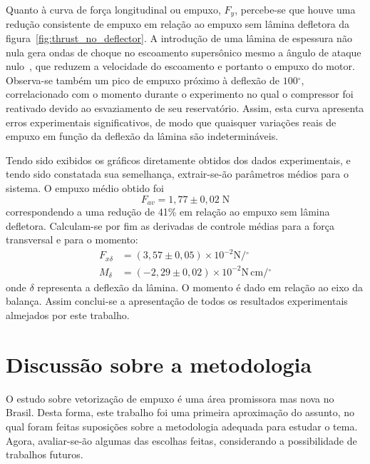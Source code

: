 Quanto à curva de força longitudinal ou empuxo, \(F_y\), percebe-se que houve uma redução consistente de empuxo em relação ao empuxo sem lâmina defletora da figura~\ref{fig:thrust_no_deflector}. A introdução de uma lâmina de espessura não nula gera ondas de choque no escoamento supersônico mesmo a ângulo de ataque nulo~\cite{anderson}, que reduzem a velocidade do escoamento e portanto o empuxo do motor. Observa-se também um pico de empuxo próximo à deflexão de \(100\mathrm{^\circ}\), correlacionado com o momento durante o experimento no qual o compressor foi reativado devido ao esvaziamento de seu reservatório. Assim, esta curva apresenta erros experimentais significativos, de modo que quaisquer variações reais de empuxo em função da deflexão da lâmina são indetermináveis.

Tendo sido exibidos os gráficos diretamente obtidos dos dados experimentais, e tendo sido constatada sua semelhança, extrair-se-ão parâmetros médios para o sistema. O empuxo médio obtido foi 
\begin{equation}
    F_{av} = 1,77 \pm 0,02\;\mathrm{N}
\end{equation}
correspondendo a uma redução de 41\% em relação ao empuxo sem lâmina defletora. Calculam-se por fim as derivadas de controle médias para a força transversal e para o momento:
\begin{align}
    F_{x\delta} &= (3,57 \pm 0,05)\times10^{-2} \mathrm{N} / \mathrm{^\circ} \\
    M_\delta &= (-2,29 \pm 0,02)\times10^{-2} \mathrm{N}\,\mathrm{cm} / \mathrm{^\circ}
\end{align}
onde \(\delta \) representa a deflexão da lâmina. O momento é dado em relação ao eixo da balança. Assim conclui-se a apresentação de todos os resultados experimentais almejados por este trabalho.

\section{Discussão sobre a metodologia}\label{sec:discussion}

O estudo sobre vetorização de empuxo é uma área promissora mas nova no Brasil. Desta forma, este trabalho foi uma primeira aproximação do assunto, no qual foram feitas suposições sobre a metodologia adequada para estudar o tema. Agora, avaliar-se-ão algumas das escolhas feitas, considerando a possibilidade de trabalhos futuros.

